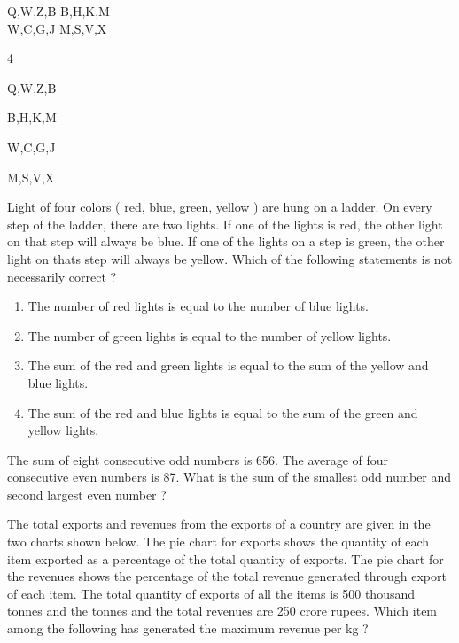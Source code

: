 		Q,W,Z,B		B,H,K,M	\\
		W,C,G,J		M,S,V,X \\
		\begin{enumerate}
		\end{enumerate}
	\item Light of four colors ( red, blue, green, yellow ) are hung on a ladder. On every step of the ladder, there are two lights. If one of the lights is red, the other light on that step will always be blue. If one of the lights on a step is green, the other light on thats step will always be yellow. Which of the following statements is not necessarily correct ?
		\begin{enumerate}
			\item The number of red lights is equal to the number of blue lights.
			\item The number of green lights is equal to the number of yellow lights.
			\item The sum of the red and green lights is equal to the sum of the yellow and blue lights.
			\item The sum of the red and blue lights is equal to the sum of the green and yellow lights.
		\end{enumerate}
	\item The sum of eight consecutive odd numbers is 656. The average of four consecutive even numbers is 87. What is the sum of the smallest odd number and second largest even number ?
	\item The total exports and revenues from the exports of a country are given in the two charts shown below. The pie chart for exports shows the quantity of each item exported as a percentage of the total quantity of exports. The pie chart for the revenues shows the percentage of the total revenue generated through export of each item. The total quantity of exports of all the items is 500 thousand tonnes and the tonnes and the total revenues are 250 crore rupees. Which item among the following has generated the maximum revenue per kg ?
